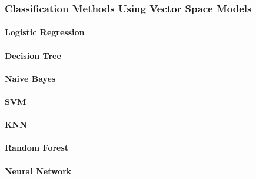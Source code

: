 %

%



\subsubsection{Classification Methods Using Vector Space Models}
\label{subs:subsection label}

\paragraph{Logistic Regression}
\paragraph{Decision Tree}
\paragraph{Naive Bayes}
\paragraph{SVM}
\paragraph{KNN}
\paragraph{Random Forest}
\paragraph{Neural Network}
